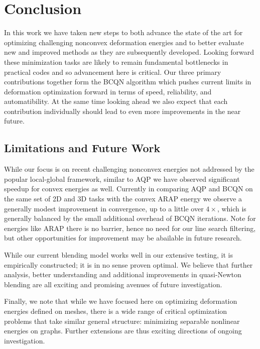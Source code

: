\section{Conclusion}

In this work we have taken new steps to both advance the state of
the art for optimizing challenging nonconvex deformation energies
and to better evaluate new and improved methods as they are
subsequently developed. Looking forward these minimization tasks
are likely to remain fundamental bottlenecks in practical codes and
so advancement here is critical. Our three primary contributions
together form the BCQN algorithm which pushes current limits in
deformation optimization forward in terms of speed, reliability, and
automatibility.
At the same time looking ahead we also expect that each contribution
individually should lead to even more improvements in the near
future.

\subsection{Limitations and Future Work}

While our focus is on recent challenging
nonconvex energies not addressed by the popular
local-global framework, similar to AQP we have observed
significant speedup for convex energies as well.  Currently
in comparing AQP and BCQN on the same set of 2D and 3D tasks with
the convex ARAP energy we observe a generally modest improvement
in convergence, up to a little over $4\times$, which is generally balanced
by the small additional overhead of BCQN iterations. Note for energies
like ARAP there is no barrier, hence no need for our line search filtering,
but other opportunities for improvement may be abailable in future research.

While our current blending model works well in
our extensive testing, it is empirically constructed; it is in no
sense proven optimal. We believe that further analysis, better
understanding and additional improvements in quasi-Newton blending
are all exciting and promising avenues of future investigation.

Finally, we note that while we have focused here on optimizing
deformation energies defined on meshes, there is a wide range
of critical optimization problems that take similar general structure:
minimizing separable nonlinear energies on graphs. Further extensions
are thus exciting directions of ongoing investigation.